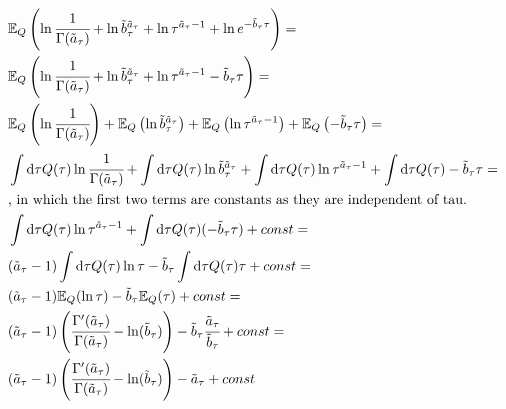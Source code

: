 \documentclass[11pt,notitlepage]{article}
\begin{document}
\begin{itemize}
\begin{align*}
&\mathbb{E}_Q \left( \ln \cfrac{1}{\Gamma(\tilde{a}_{\tau})} + \ln \tilde{b}_{\tau}^{\tilde{a}_{\tau}}+\ln \tau^{\tilde{a}_{\tau} -1 } + \ln e^{-\tilde{b}_{\tau} \tau} \right) = \\
&\mathbb{E}_Q \left( \ln \cfrac{1}{\Gamma(\tilde{a}_{\tau})} + \ln \tilde{b}_{\tau}^{\tilde{a}_{\tau}}+\ln \tau^{\tilde{a}_{\tau} -1 } -\tilde{b}_{\tau} \tau \right) = \\
& \mathbb{E}_Q \left( \ln \cfrac{1}{\Gamma(\tilde{a}_{\tau})} \right) + \mathbb{E}_Q \left( \ln \tilde{b}_{\tau}^{\tilde{a}_{\tau}} \right) + \mathbb{E}_Q \left( \ln \tau^{\tilde{a}_{\tau} -1 } \right) + \mathbb{E}_Q \left( -\tilde{b}_{\tau} \tau \right) =\\
&\int \mathrm{d}\tau Q(\tau)\ln \cfrac{1}{\Gamma(\tilde{a}_{\tau})}  + \int \mathrm{d}\tau Q(\tau)\ln \tilde{b}_{\tau}^{\tilde{a}_{\tau}}  + \int \mathrm{d}\tau Q(\tau) \ln \tau^{\tilde{a}_{\tau} -1 } + \int \mathrm{d}\tau  Q(\tau) -\tilde{b}_{\tau} \tau=\\
&\text{, in which the first two terms are constants as they are independent of tau.}\\
& \int \mathrm{d}\tau Q(\tau) \ln \tau^{\tilde{a}_{\tau} -1 } + \int \mathrm{d}\tau  Q(\tau) (-\tilde{b}_{\tau} \tau) + const=\\
& (\tilde{a}_{\tau} -1) \int \mathrm{d}\tau Q(\tau) \ln \tau - \tilde{b}_{\tau}\int \mathrm{d}\tau  Q(\tau) \tau+ const=\\
&(\tilde{a}_{\tau} -1) \mathbb{E}_Q(\ln \tau) - \tilde{b}_{\tau} \mathbb{E}_Q(\tau)+ const=\\
&(\tilde{a}_{\tau} -1)\left( \cfrac{\Gamma'(\tilde{a}_{\tau})}{\Gamma(\tilde{a}_{\tau})} - \ln(\tilde{b}_{\tau}) \right) - \tilde{b}_{\tau} \cfrac{\tilde{a}_{\tau}}{\tilde{b}_{\tau}}+ const =\\
&(\tilde{a}_{\tau} -1)\left( \cfrac{\Gamma'(\tilde{a}_{\tau})}{\Gamma(\tilde{a}_{\tau})} - \ln(\tilde{b}_{\tau}) \right) - \tilde{a}_{\tau}+ const
\end{align*}
\end{itemize}
\end{document}
